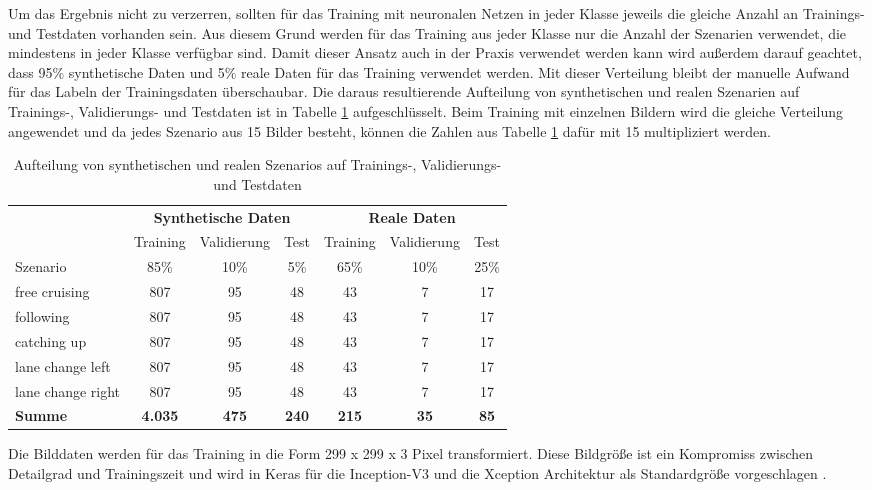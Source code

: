 Um das Ergebnis nicht zu verzerren, sollten für das Training mit neuronalen Netzen in jeder Klasse jeweils die gleiche Anzahl an Trainings- und Testdaten vorhanden sein. Aus diesem Grund werden für das Training aus jeder Klasse nur die Anzahl der Szenarien verwendet, die mindestens in jeder Klasse verfügbar sind. Damit dieser Ansatz auch in der Praxis verwendet werden kann wird außerdem darauf geachtet, dass 95\% synthetische Daten und 5\% reale Daten für das Training verwendet werden. Mit dieser Verteilung bleibt der manuelle Aufwand für das Labeln der Trainingsdaten überschaubar. Die daraus resultierende Aufteilung von synthetischen und realen Szenarien auf Trainings-, Validierungs- und Testdaten ist in Tabelle \ref{tab_daten_aufteilung} aufgeschlüsselt. Beim Training mit einzelnen Bildern wird die gleiche Verteilung angewendet und da jedes Szenario aus 15 Bilder besteht, können die Zahlen aus Tabelle \ref{tab_daten_aufteilung} dafür mit 15 multipliziert werden.

\begin{table}[h]
\centering
\def\arraystretch{1.4}
\begin{tabular}{l c c c c c c}

& \multicolumn{3}{c}{\textbf{Synthetische Daten}} & \multicolumn{3}{c}{\textbf{\textbf{Reale Daten}}} \\
& Training & Validierung & Test & Training & Validierung & Test \\
Szenario & 85\% & 10\% & 5\% & 65\% & 10\% & 25\% \\
\hline
free cruising & 807 & 95 & 48 & 43 & 7 & 17 \\
following & 807 & 95 & 48 & 43 & 7 & 17 \\
catching up & 807 & 95 & 48 & 43 & 7 & 17 \\
lane change left & 807 & 95 & 48 & 43 & 7 & 17 \\
lane change right & 807 & 95 & 48 & 43 & 7 & 17 \\
\hline
\textbf{Summe} & \textbf{4.035} & \textbf{475} & \textbf{240} & \textbf{215} & \textbf{35} & \textbf{85} \\
\hline

\end{tabular}
\caption{Aufteilung von synthetischen und realen Szenarios auf Trainings-, Validierungs- und Testdaten}
\label{tab_daten_aufteilung}
\end{table}

Die Bilddaten werden für das Training in die Form 299 x 299 x 3 Pixel transformiert. Diese Bildgröße ist ein Kompromiss zwischen Detailgrad und Trainingszeit und wird in Keras für die Inception-V3 und die Xception Architektur als Standardgröße vorgeschlagen \cite{chollet2015keras}.

